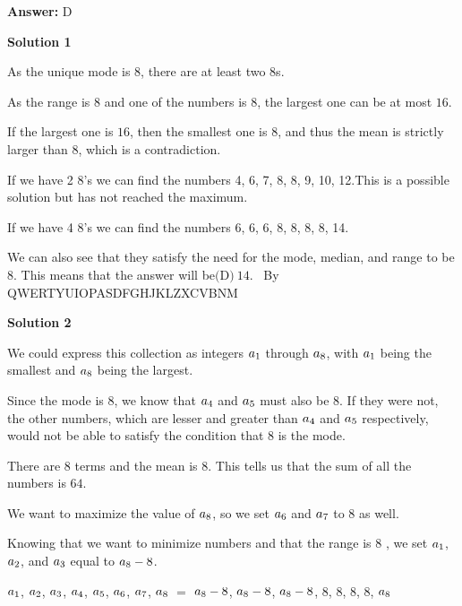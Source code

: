 \begin{enumerate}
 \textbf{Answer: }D



\textbf{Solution 1}

As the unique mode is $8$, there are at least two $8$s.

 As the range is $8$ and one of the numbers is $8$, the largest one can be at most $16$.

 If the largest one is $16$, then the smallest one is $8$, and thus the mean is strictly larger than $8$, which is a contradiction.

 If we have 2 8's we can find the numbers 4, 6, 7, 8, 8, 9, 10, 12.This is a possible solution but has not reached the maximum.

 If we have 4 8's we can find the numbers 6, 6, 6, 8, 8, 8, 8, 14.

 We can also see that they satisfy the need for the mode, median, and range to be 8. This means that the answer will be$\boxed{\text{(D)}\ 14 }$. ~By QWERTYUIOPASDFGHJKLZXCVBNM

 



\textbf{Solution 2}

We could express this collection as integers $a\textsubscript{1}$ through $a\textsubscript{8}$, with $a\textsubscript{1}$ being the smallest and $a\textsubscript{8}$ being the largest.

 Since the mode is $8$, we know that $a\textsubscript{4}$ and $a\textsubscript{5}$ must also be $8$. If they were not, the other numbers, which are lesser and greater than $a\textsubscript{4}$ and $a\textsubscript{5}$ respectively, would not be able to satisfy the condition that $8$ is the mode.

 There are $8$ terms and the mean is $8$. This tells us that the sum of all the numbers is $64$.

 We want to maximize the value of $a\textsubscript{8}$, so we set  $a\textsubscript{6}$ and $a\textsubscript{7}$ to $8$ as well.

 Knowing that we want to minimize numbers and that the range is $8$ , we set $a\textsubscript{1}$, $a\textsubscript{2}$, and $a\textsubscript{3}$ equal to $a\textsubscript{8} - 8$.

 {$a\textsubscript{1}$, $a\textsubscript{2}$, $a\textsubscript{3}$, $a\textsubscript{4}$, $a\textsubscript{5}$, $a\textsubscript{6}$, $a\textsubscript{7}$, $a\textsubscript{8}$} $=$ {$a\textsubscript{8} - 8$, $a\textsubscript{8} - 8$, $a\textsubscript{8} - 8$, $8$, $8$, $8$, $8$, $a\textsubscript{8}$}


\end{enumerate}
